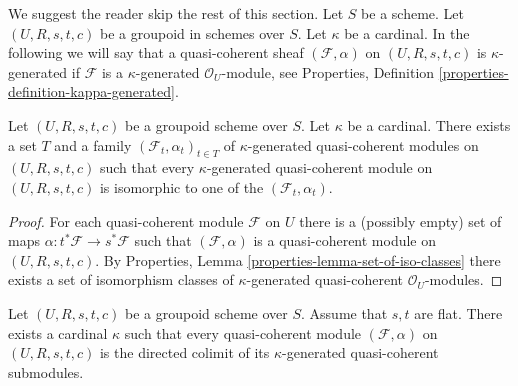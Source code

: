 \noindent
We suggest the reader skip the rest of this section. Let $S$ be a scheme.
Let $(U, R, s, t, c)$ be a groupoid in schemes over $S$. Let $\kappa$ be a
cardinal. In the following we will say that a quasi-coherent sheaf
$(\mathcal{F}, \alpha)$ on $(U, R, s, t, c)$ is $\kappa$-generated if
$\mathcal{F}$ is a $\kappa$-generated $\mathcal{O}_U$-module, see
Properties, Definition \ref{properties-definition-kappa-generated}.

\begin{lemma}
\label{lemma-set-of-iso-classes}
Let $(U, R, s, t, c)$ be a groupoid scheme over $S$.
Let $\kappa$ be a cardinal.
There exists a set $T$ and a family $(\mathcal{F}_t, \alpha_t)_{t \in T}$ of
$\kappa$-generated quasi-coherent modules on $(U, R, s, t, c)$
such that every $\kappa$-generated quasi-coherent module on
$(U, R, s, t, c)$ is isomorphic to one of the $(\mathcal{F}_t, \alpha_t)$.
\end{lemma}

\begin{proof}
For each quasi-coherent module $\mathcal{F}$ on $U$ there is a
(possibly empty) set of maps $\alpha : t^*\mathcal{F} \to s^*\mathcal{F}$
such that $(\mathcal{F}, \alpha)$ is a quasi-coherent module on
$(U, R, s, t, c)$. By
Properties, Lemma \ref{properties-lemma-set-of-iso-classes}
there exists a set of isomorphism classes of $\kappa$-generated
quasi-coherent $\mathcal{O}_U$-modules.
\end{proof}

\begin{lemma}
\label{lemma-colimit-kappa}
Let $(U, R, s, t, c)$ be a groupoid scheme over $S$.
Assume that $s, t$ are flat. There exists a
cardinal $\kappa$ such that every quasi-coherent module
$(\mathcal{F}, \alpha)$ on $(U, R, s, t, c)$
is the directed colimit of its $\kappa$-generated
quasi-coherent submodules.
\end{lemma}

